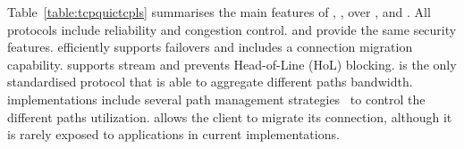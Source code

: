 Table~\ref{table:tcpquictcpls} summarises the main features of \tcp, \mptcp, 
\tls over \tcp, and \quic. All protocols include reliability and congestion 
control. \tls and \quic provide the same security features. \mptcp efficiently 
supports failovers and \quic includes a connection migration capability. \quic 
supports stream and prevents Head-of-Line (HoL) blocking. \mptcp is the only
standardised protocol that is able to aggregate different paths bandwidth. 
\mptcp implementations include several path management 
strategies~\cite{hesmans2015smapp,hesmans2016enhanced} to control the different 
paths utilization. \quic allows the client to migrate its connection, although 
it is rarely exposed to applications in current implementations. 













